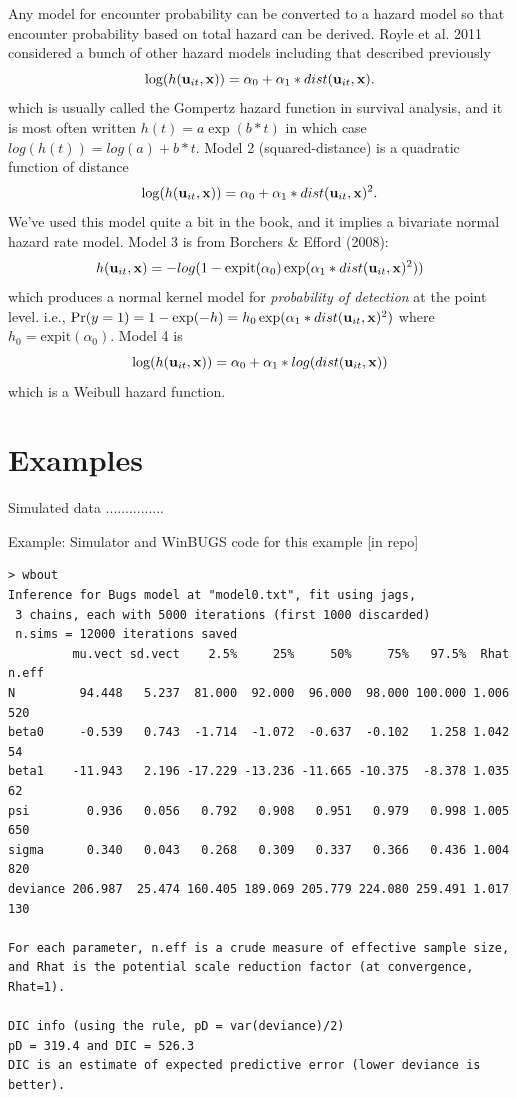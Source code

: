 Any model for encounter probability can be converted to a hazard model
so that encounter probability based on total hazard can be derived.
Royle et al. 2011 considered a bunch of other hazard models including
that described previously
\[
\log(h({\bf u}_{it},{\bf x})) = \alpha_{0} + \alpha_{1}*dist({\bf u}_{it},{\bf x}).
\]
which is usually called the Gompertz hazard function in survival
analysis, and it is most often written $h(t) = a \exp( b*t)$ in which
case $log(h(t)) = log(a) + b*t$.  Model 2 (squared-distance) is a
quadratic function of distance
\[
\log(h({\bf u}_{it},{\bf x})) = \alpha_{0} + \alpha_{1}*dist({\bf u}_{it},{\bf x})^2.
\]
We've used this model quite a bit in the book, and it implies a
bivariate normal hazard rate model. Model 3 is from Borchers \& Efford
(2008):
\[
h({\bf u}_{it},{\bf x} ) = -log(1 - \mbox{expit}(\alpha_{0})
\exp( \alpha_{1}*dist({\bf u}_{it},{\bf x})^2 ) )
\]
which produces a normal kernel model for {\it probability of
  detection} at the point level. i.e., $\Pr(y=1) = 1-\exp(-h) = h_{0}
\exp( \alpha_{1}*dist({\bf u}_{it},{\bf x})^2 )$ where $h_{0} =
\mbox{expit}(\alpha_{0})$.  Model 4 is
\[
\log(h({\bf u}_{it},{\bf x})) = \alpha_{0} + \alpha_{1}*log(dist({\bf u}_{it},{\bf x}))
\]
which is a Weibull hazard function.













\section{Examples}


Simulated data ...............

 Example: Simulator and WinBUGS code for this example [in repo]



\begin{verbatim}
> wbout
Inference for Bugs model at "model0.txt", fit using jags,
 3 chains, each with 5000 iterations (first 1000 discarded)
 n.sims = 12000 iterations saved
         mu.vect sd.vect    2.5%     25%     50%     75%   97.5%  Rhat n.eff
N         94.448   5.237  81.000  92.000  96.000  98.000 100.000 1.006   520
beta0     -0.539   0.743  -1.714  -1.072  -0.637  -0.102   1.258 1.042    54
beta1    -11.943   2.196 -17.229 -13.236 -11.665 -10.375  -8.378 1.035    62
psi        0.936   0.056   0.792   0.908   0.951   0.979   0.998 1.005   650
sigma      0.340   0.043   0.268   0.309   0.337   0.366   0.436 1.004   820
deviance 206.987  25.474 160.405 189.069 205.779 224.080 259.491 1.017   130

For each parameter, n.eff is a crude measure of effective sample size,
and Rhat is the potential scale reduction factor (at convergence, Rhat=1).

DIC info (using the rule, pD = var(deviance)/2)
pD = 319.4 and DIC = 526.3
DIC is an estimate of expected predictive error (lower deviance is better).
\end{verbatim}




